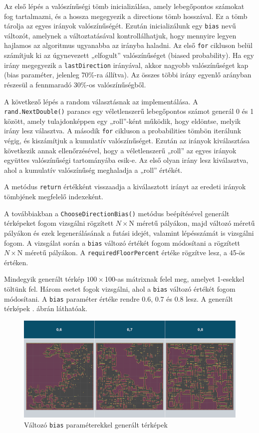 Az első lépés a valószínűségi tömb inicializálása, amely lebegőpontos számokat fog tartalmazni, és a hossza megegyezik a directions tömb hosszával. Ez a tömb tárolja az egyes irányok valószínűségét. Ezután inicializálunk egy \texttt{bias} nevű változót, amelynek a változtatásával kontrollálhatjuk, hogy mennyire legyen hajlamos az algoritmus ugyanabba az irányba haladni. Az első \texttt{for} cikluson belül számítjuk ki az úgynevezett „elfogult” valószínűséget (biased probability). Ha egy irány megegyezik a \texttt{lastDirection} irányával, akkor nagyobb valószínűséget kap (bias paraméter, jelenleg 70\%-ra állítva). Az összes többi irány egyenlő arányban részesül a fennmaradó 30\%-os valószínűségből.

A következő lépés a random választásnak az implementálása. A \texttt{rand.NextDouble()} parancs egy véletlenszerű lebegőpontos számot generál 0 és 1 között, amely tulajdonképpen egy „roll”-ként működik, hogy eldöntse, melyik irány lesz választva. A második \texttt{for} cikluson a probabilities tömbön iterálunk végig, és kiszámítjuk a kumulatív valószínűséget. Ezután az irányok kiválasztása következik annak ellenőrzésével, hogy a véletlenszerű „roll” az egyes irányok együttes valószínűségi tartományába esik-e. Az első olyan irány lesz kiválasztva, ahol a kumulatív valószínűség meghaladja a „roll” értékét.

A metódus \texttt{return} értékként visszaadja a kiválasztott irányt az eredeti irányok tömbjének megfelelő indexeként.

A továbbiakban a \texttt{ChooseDirectionBias()} metódus beépítésével generált térképeket fogom vizsgálni rögzített $N \times $N méretű pályákon, majd változó méretű pályákon és ezek legenerálásának a futási idejét, valamint lépésszámát is vizsgálni fogom. A vizsgálat során a \texttt{bias} változó értékét fogom módosítani a rögzített $N \times $N  méretű pályákon. A \texttt{requiredFloorPercent} értéke rögzítve lesz, a 45-ös értéken.

Mindegyik generált térkép $100 \times $100-as mátrixnak felel meg, amelyet 1-esekkel töltünk fel. Három esetet fogok vizsgálni, ahol a \texttt{bias} változó értékét fogom módosítani. A \texttt{bias} paraméter értéke rendre 0.6, 0.7 és 0.8 lesz. A generált térképek . ábrán láthatóak.

\begin{figure}[ht]
\centering
\includegraphics[width = \textwidth]{images/fixedpercentrandomwalk.png}
\caption{Változó \texttt{bias} paraméterekkel generált térképek}
\label{fig:fixedPercentRandomWalk}
\end{figure}

